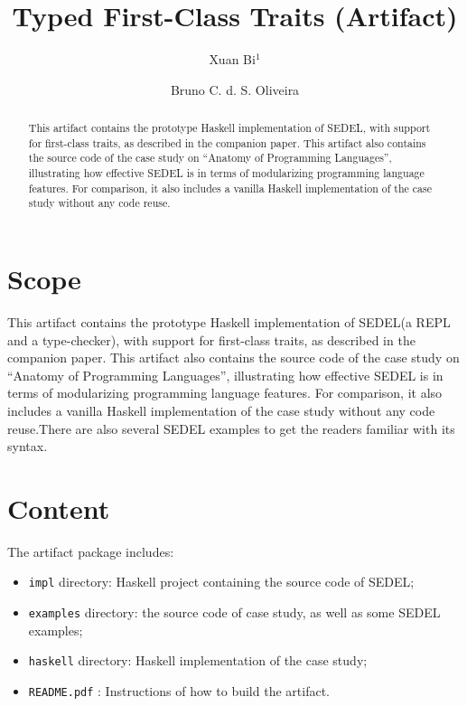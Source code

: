 \documentclass[a4paper,UKenglish]{darts-v2018}
\title{Typed First-Class Traits (Artifact)}
\author{Xuan Bi$^1$}{The University of Hong Kong, Hong Kong, China}{xbi@cs.hku.hk}{}{}%
\author{Bruno C. d. S. Oliveira}{The University of Hong Kong, Hong Kong, China}{bruno@cs.hku.hk}{}{Funded by Hong Kong Research Grant Council projects number 17210617 and 17258816}
\newenvironment{scope}{\section{Scope}}{}
\newenvironment{content}{\section{Content}}{}
\newcommand\name{\textsf{SEDEL}\xspace}
\begin{document}
\maketitle

\begin{abstract}
  This artifact contains the prototype Haskell implementation of \name, with
  support for first-class traits, as described in the companion paper. This artifact
  also contains the source code of the case study on ``Anatomy of Programming
  Languages'', illustrating how effective \name is in terms of modularizing
  programming language features. For comparison, it also includes a vanilla Haskell implementation
  of the case study without any code reuse.
 \end{abstract}


\begin{scope}
  This artifact contains the prototype Haskell implementation of \name (a REPL
  and a type-checker), with support for first-class traits, as described in the
  companion paper. This artifact also contains the source code of the case study
  on ``Anatomy of Programming Languages'', illustrating how effective \name is
  in terms of modularizing programming language features. For comparison, it
  also includes a vanilla Haskell implementation of the case study without any
  code reuse.There are also several \name examples to get the readers familiar
  with its syntax.
\end{scope}

\begin{content}
The artifact package includes:
\begin{itemize}
\item \texttt{impl} directory: Haskell project containing the source code of \name;
\item \texttt{examples} directory: the source code of case study, as well as some \name examples;
\item \texttt{haskell} directory: Haskell implementation of the case study;
\item \texttt{README.pdf} : Instructions of how to build the artifact.
\end{itemize}
\end{content}
\end{document}
